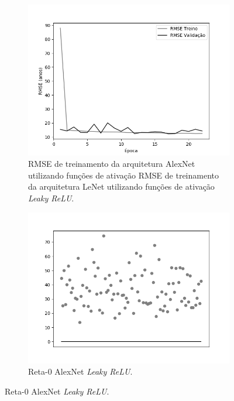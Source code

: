 \begin{figure}[hb!]
\begin{subfigure}[hb]{0.5\linewidth}
		\end{subfigure}\\
		\begin{subfigure}[hb]{0.5\linewidth}
			\caption{RMSE de treinamento da arquitetura AlexNet utilizando funções de ativação RMSE de treinamento da arquitetura LeNet utilizando funções de ativação \emph{Leaky ReLU}.}
			\centering
			\includegraphics[width=\linewidth]{img/graficos/history/alexnet/fig-history-image-treat-3-alexnet-lrelu-rmse.png}
		\end{subfigure}
		\begin{subfigure}[hb]{0.5\linewidth}
			\caption{Reta-0 AlexNet \emph{Leaky ReLU}.}
			\includegraphics[width=\linewidth]{img/graficos/reta0/alexnet/fig-reta-0-image-treat-3-alexnet-lrelu.png}
		\end{subfigure}%
	\end{figure}

